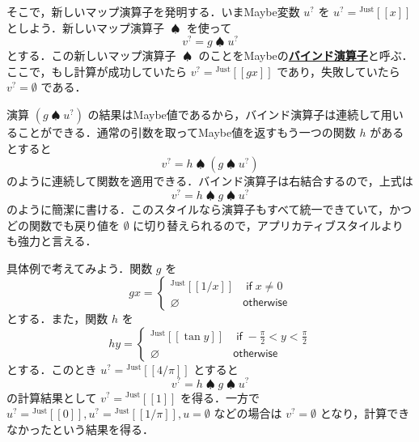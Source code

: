 \documentclass[a4paper,twocolumn]{jsbook}
\def\[{\left[\!\left[}
\def\]{\right]\!\right]}
\newcommand{\keyword}[1]{{\underline{\textbf{#1}}}}
\newcommand{\mKeyword}[1]{\mathsf{#1}} %
\newcommand{\mIfKeyword}{\mKeyword{if}}
\newcommand{\mOtherwiseKeyword}{\mKeyword{otherwise}}
\DeclareMathOperator{\mIf}{\mIfKeyword}
\DeclareMathOperator{\mOtherwise}{\mOtherwiseKeyword}
\newcommand{\mNothing}{\emptyset}
\newcommand{\mPureNothing}{\varnothing}
\DeclareMathOperator{\mBindMaybe}{\spadesuit}
\newcommand{\mGenericValueConstructor}[1]{\mathrm{#1}}
\newcommand{\mGenericWith}[2]{{}^\mGenericValueConstructor{#1}\[#2\]}
\newcommand{\mJustWith}[1]{\mGenericWith{Just}{#1}}
\newcommand{\mMaybe}[1]{{#1}^?}
\begin{document}
そこで，新しいマップ演算子を発明する．いまMaybe変数 $\mMaybe{u}$ を $\mMaybe{u}=\mJustWith{x}$ としよう．新しいマップ演算子 $\mBindMaybe$ を使って
\begin{equation}
\mMaybe{v}=g\mBindMaybe\mMaybe{u}
\end{equation}
とする．この新しいマップ演算子 $\mBindMaybe$ のことをMaybeの\keyword{バインド演算子}と呼ぶ．ここで，もし計算が成功していたら $\mMaybe{v}=\mJustWith{gx}$ であり，失敗していたら $\mMaybe{v}=\mNothing$ である．

演算 $(g\mBindMaybe\mMaybe{u})$ の結果はMaybe値であるから，バインド演算子は連続して用いることができる．通常の引数を取ってMaybe値を返すもう一つの関数 $h$ があるとすると
\begin{equation}
\mMaybe{v}=h\mBindMaybe{}(g\mBindMaybe\mMaybe{u})
\end{equation}
のように連続して関数を適用できる．バインド演算子は右結合するので，上式は
\begin{equation}
\label{eq:maybe-z-bind-style}
\mMaybe{v}=h\mBindMaybe g\mBindMaybe\mMaybe{u}
\end{equation}
のように簡潔に書ける．このスタイルなら演算子もすべて統一できていて，かつどの関数でも戻り値を $\mNothing$ に切り替えられるので，アプリカティブスタイルよりも強力と言える．

具体例で考えてみよう．関数 $g$ を
\begin{equation}
gx=\begin{cases}
\mJustWith{1/x}&\mIf x\neq0\\
\mPureNothing&\mOtherwise
\end{cases}
\end{equation}
とする．また，関数 $h$ を
\begin{equation}
hy=\begin{cases}
\mJustWith{\tan y}&\mIf -\frac{\pi}{2}<y<\frac{\pi}{2}\\
\mPureNothing&\mOtherwise
\end{cases}
\end{equation}
とする．このとき $\mMaybe{u}=\mJustWith{4/\pi}$ とすると
\begin{equation}
\mMaybe{v}=h\mBindMaybe g\mBindMaybe\mMaybe{u}
\end{equation}
の計算結果として $\mMaybe{v}=\mJustWith{1}$ を得る．一方で $\mMaybe{u}=\mJustWith{0},\mMaybe{u}=\mJustWith{1/\pi},u=\mNothing$ などの場合は $\mMaybe{v}=\mNothing$ となり，計算できなかったという結果を得る．

\end{document}
